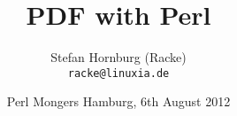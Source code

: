 \usepackage[utf8]{inputenc}
\usepackage[T1]{fontenc}
\usepackage{mathptmx}
\usepackage[scaled=.90]{helvet}
\usepackage{courier}

\usepackage{beamerthemesplit}
\usepackage{verbatim}
\usepackage{hyperref}
\usepackage{listings}
\lstset{language=Perl,basicstyle=\footnotesize,tabsize=3,showstringspaces=false}

\title{PDF with Perl}
\author[racke]{Stefan Hornburg (Racke)\\ \texttt{racke@linuxia.de}}
\date[]{Perl Mongers Hamburg, 6th August 2012}


\maketitle{}

\begin{frame}
  \titlepage
\end{frame}

\tableofcontents



